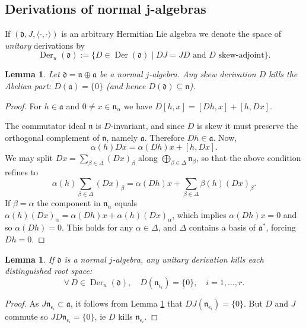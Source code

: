 \documentclass[12pt, twoside]{amsart}
\def\d{\mathfrak{d}}
\def\n{\mathfrak{n}}
\def\a{\mathfrak{a}}
\def\pint{\langle \cdotp,\cdotp \rangle }
\newcommand{\op}[1]{\operatorname{#1}}
\newtheorem{lemma}[definition]{Lemma}
\theoremstyle{definition}
\begin{document}
\bigbreak 

\subsection{Derivations of normal j-algebras} 

If $(\d,J,\pint)$ is an arbitrary Hermitian Lie algebra we denote the space of \textit{unitary} derivations by 
\[ \op{Der}_{u}(\d):=\{ D \in \op{Der}(\d)  \mid DJ=JD \text{ and } D \text{ skew-adjoint}\}.\]

\begin{lemma} \label{Da=0}
    Let  $\d=\n\oplus \a$ be a  normal $j$-algebra. Any skew derivation $D$ kills the Abelian part: $D(\a)=\{0\}$ (and hence $D(\d)\subseteq \n$). 
\end{lemma}
\begin{proof}
For $h \in \a$ and $0\neq x \in \n_{\alpha}$ we have  $D[h, x]=[Dh, x]+[h,Dx]$. 

The commutator ideal $\n$ is $D$-invariant, and since $D$ is skew it must preserve the orthogonal complement of $\n$, namely $\a$. Therefore $D h\in\a$. Now, 
\begin{equation*}
   \alpha(h)Dx=\alpha(Dh)x+[h,Dx].
\end{equation*}
We may split $Dx= \displaystyle\sum_{\beta \in \Delta}(Dx)_{\beta}$ along 
$\displaystyle\bigoplus_{\beta\in \Delta} \n_\beta$, so that the above condition refines to 
\[  \alpha(h) \sum_{\beta \in \Delta} (Dx)_{\beta}=\alpha(Dh)x+\sum_{\beta \in \Delta} \beta(h)(Dx)_{\beta}.
\]
If $\beta= \alpha$ the component in $\n_{\alpha}$ equals 
$    \alpha(h)(Dx)_{\alpha}=\alpha(Dh)x+\alpha(h)(Dx)_{\alpha}$,
which implies $\alpha(Dh)x=0$ and so $\alpha(Dh)=0$. 
This holds for any $\alpha \in \Delta$, and $\Delta$ contains a basis of $\a^*$, forcing $Dh=0$.
\end{proof}

\begin{lemma} \label{D cero}
If $\d$ is a normal $j$-algebra, any unitary derivation kills each distinguished root space:
$$\forall\,D\in \op{Der}_u(\d), \quad  D(\n_{\epsilon_i})=\{0\},
\quad i=1,\ldots,  r.$$
\end{lemma}

\begin{proof}
As $J \n_{\epsilon_i} \subset \a$, it follows from Lemma \ref{Da=0} that $D J (\n_{\epsilon_i})=\{0\}$. But $D$ and $J$ commute so $J D \n_{\epsilon_i}=\{0\}$, ie $D$ kills $\n_{\epsilon_i}$.
\end{proof}
\end{document}
